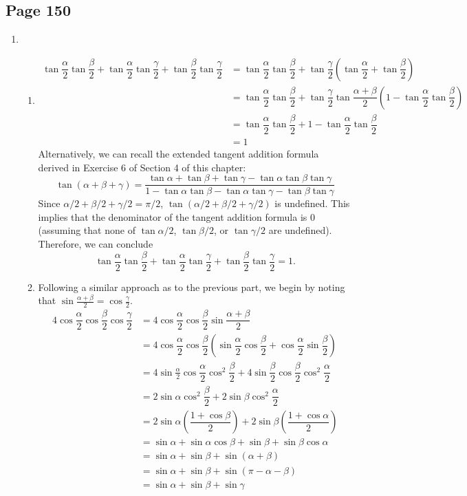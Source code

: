 \documentclass{article}
\newenvironment{solutions}[1]
{\subsection*{#1}
 \begin{enumerate}[leftmargin=1.5em]}
{\end{enumerate}}
\newcommand{\solution}{\item}
\newenvironment{subsolutions}
{\begin{enumerate}}
{\end{enumerate}}
\newcommand{\subsolution}{\item}
\begin{document}
\begin{solutions}{Page 150}
\solution %
\begin{subsolutions}
\subsolution %
\begin{align*}
\tan{\dfrac{\alpha}{2}}\tan{\dfrac{\beta}{2}} + \tan{\dfrac{\alpha}{2}}\tan{\dfrac{\gamma}{2}} + \tan{\dfrac{\beta}{2}}\tan{\dfrac{\gamma}{2}} &= \tan{\dfrac{\alpha}{2}}\tan{\dfrac{\beta}{2}} + \tan{\dfrac{\gamma}{2}} \left(\tan{\dfrac{\alpha}{2}} + \tan{\dfrac{\beta}{2}}\right) \\
&= \tan{\dfrac{\alpha}{2}}\tan{\dfrac{\beta}{2}} + \tan{\dfrac{\gamma}{2}}\tan{\dfrac{\alpha+\beta}{2}}\left(1-\tan{\dfrac{\alpha}{2}}\tan{\dfrac{\beta}{2}}\right) \\
&= \tan{\dfrac{\alpha}{2}}\tan{\dfrac{\beta}{2}} + 1-\tan{\dfrac{\alpha}{2}}\tan{\dfrac{\beta}{2}} \\
&= 1
\end{align*}
Alternatively, we can recall the extended tangent addition formula derived in Exercise 6 of Section 4 of this chapter:
\[
\tan\left(\alpha+\beta+\gamma\right) = \dfrac{\tan{\alpha}+\tan{\beta}+\tan{\gamma} -\tan{\alpha}\tan{\beta}\tan{\gamma}}{1 - \tan{\alpha}\tan{\beta} - \tan{\alpha}\tan{\gamma} - \tan{\beta}\tan{\gamma}}
\]
Since $\alpha/2 + \beta/2 + \gamma/2 = \pi / 2$, $\tan\left(\alpha/2 + \beta/2 + \gamma/2\right)$ is undefined. This implies that the denominator of the tangent addition formula is 0 (assuming that none of $\tan{\alpha/2}$, $\tan{\beta/2}$, or $\tan{\gamma/2}$ are undefined). Therefore, we can conclude
\[
\tan{\dfrac{\alpha}{2}}\tan{\dfrac{\beta}{2}} + \tan{\dfrac{\alpha}{2}}\tan{\dfrac{\gamma}{2}} + \tan{\dfrac{\beta}{2}}\tan{\dfrac{\gamma}{2}} = 1.
\]
\subsolution %
Following a similar approach as to the previous part, we begin by noting that $\sin{\tfrac{\alpha+\beta}{2}} = \cos{\tfrac{\gamma}{2}}$.
\begin{align*}
4\cos{\dfrac{\alpha}{2}}\cos{\dfrac{\beta}{2}}\cos{\dfrac{\gamma}{2}} &= 4\cos{\dfrac{\alpha}{2}}\cos{\dfrac{\beta}{2}}\sin{\dfrac{\alpha+\beta}{2}} \\
&=4\cos{\dfrac{\alpha}{2}}\cos{\dfrac{\beta}{2}}\left(\sin{\dfrac{\alpha}{2}}\cos{\dfrac{\beta}{2}} + \cos{\dfrac{\alpha}{2}}\sin{\dfrac{\beta}{2}}\right) \\
&= 4\sin{\frac{\alpha}{2}}\cos{\dfrac{\alpha}{2}}\cos^{2}{\dfrac{\beta}{2}} + 4\sin{\dfrac{\beta}{2}}\cos{\dfrac{\beta}{2}}\cos^{2}{\dfrac{\alpha}{2}} \\
&= 2\sin{\alpha}\cos^{2}{\dfrac{\beta}{2}}+2\sin{\beta}\cos^{2}{\dfrac{\alpha}{2}} \\
&= 2\sin{\alpha}\left(\dfrac{1+\cos{\beta}}{2}\right)+2\sin{\beta}\left(\dfrac{1+\cos{\alpha}}{2}\right) \\
&= \sin{\alpha} + \sin{\alpha}\cos{\beta} + \sin{\beta} + \sin{\beta}\cos{\alpha} \\
&= \sin{\alpha} + \sin{\beta} + \sin\left(\alpha+\beta\right) \\
&= \sin{\alpha} + \sin{\beta} + \sin\left(\pi - \alpha - \beta\right) \\
&= \sin{\alpha} + \sin{\beta} + \sin{\gamma}
\end{align*}
\end{subsolutions}
\end{solutions}
\end{document}
